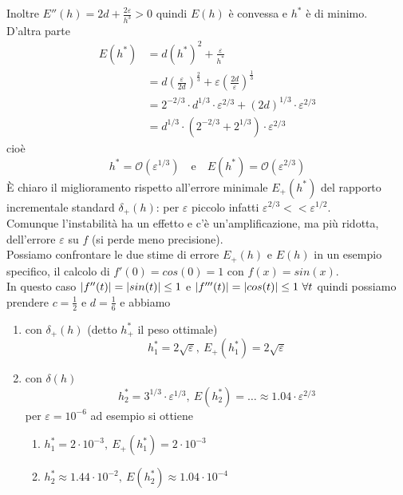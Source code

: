 Inoltre $E''(h) = 2d + \frac{2\varepsilon}{h^3} > 0$ quindi $E(h)$ è convessa e $h^*$ è di minimo.\\
D'altra parte
\[
\begin{split}
    E(h^*) & = d(h^*)^2 + \frac{\varepsilon}{h^*} \\
    & = d(\frac{\varepsilon}{2d})^{\frac{2}{3}} + \varepsilon(\frac{2d}{\varepsilon})^{\frac{1}{3}} \\
    & = 2^{-2/3} \cdot d^{1/3} \cdot \varepsilon^{2/3} + (2d)^{1/3} \cdot \varepsilon^{2/3} \\
    & = d^{1/3} \cdot (2^{-2/3} + 2^{1/3}) \cdot \varepsilon^{2/3}
\end{split}
\]
cioè
\[
h^* = \mathcal{O}(\varepsilon^{1/3}) \quad \text{e} \quad E(h^*) = \mathcal{O}(\varepsilon^{2/3})
\]
È chiaro il miglioramento
rispetto all'errore minimale $E_+(h^*)$ del rapporto incrementale standard $\delta_+(h)$: per $\varepsilon$ piccolo infatti $\varepsilon^{2/3} << \varepsilon^{1/2}$.\\
Comunque l'instabilità ha un effetto e c'è un'amplificazione, ma più ridotta, dell'errore $\varepsilon$ su $f$ (si perde meno precisione).\\
Possiamo confrontare le due stime di errore $E_+(h)$ e $E(h)$ in un esempio specifico, il calcolo di $f'(0) = cos(0) = 1$ con $f(x) = sin(x)$.\\
In questo caso $\lvert f''(t)\rvert = \lvert sin(t)\rvert \le 1$
e $\lvert f'''(t)\rvert = \lvert cos(t)\rvert \le 1 \ \forall t$ quindi possiamo prendere $c = \frac{1}{2}$ e $d = \frac{1}{6}$ e abbiamo
\begin{enumerate}
    \item con $\delta_+(h)$ (detto $h_+^*$ il peso ottimale)
    \[
        h_1^* = 2 \sqrt{\varepsilon}, \ E_+(h_1^*) = 2 \sqrt{\varepsilon}
    \]
    \item con $\delta(h)$
    \[
        h_2^* = 3^{1/3} \cdot \varepsilon^{1/3}, \ E(h_2^*) = \dotso \approx 1.04 \cdot \varepsilon^{2/3}
    \]
    per $\varepsilon = 10^{-6}$ ad esempio si ottiene
    \begin{enumerate}
        \item $h_1^* = 2 \cdot 10^{-3}, \ E_+(h_1^*) = 2 \cdot 10^{-3}$
        \item $h_2^* \approx 1.44 \cdot 10^{-2}, \ E(h_2^*) \approx 1.04 \cdot 10^{-4}$
    \end{enumerate}
\end{enumerate}
